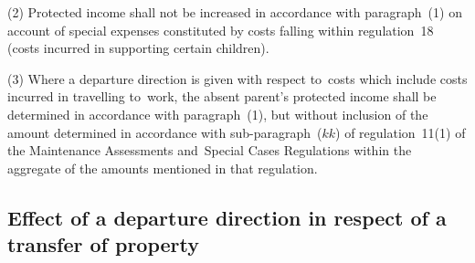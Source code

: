 \documentclass[12pt,a4paper]{article}
\begin{document}
(2) Protected income shall not be increased in accordance with paragraph~(1) on
account of special expenses constituted by costs falling within regulation~18
(costs incurred in supporting certain children).

(3) Where a departure direction is given with respect to~costs which include
costs incurred in travelling to~work, the absent parent’s protected income shall
be determined in accordance with paragraph~(1), but without inclusion of the
amount determined in accordance with sub-paragraph~($kk$) of regulation~11(1) of
the Maintenance Assessments and~Special Cases Regulations within the aggregate
of the amounts mentioned in that regulation.

\subsection[39. Effect of a departure direction in respect of a transfer of property]{Effect of a departure direction in respect of a transfer of property}
\end{document}
